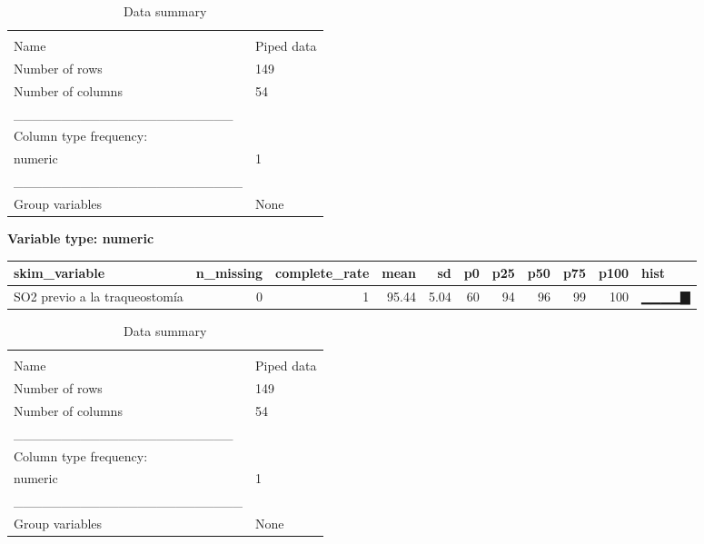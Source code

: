 \documentclass[
]{article}
\newenvironment{Shaded}{\begin{snugshade}}{\end{snugshade}}
\newcommand{\AttributeTok}[1]{\textcolor[rgb]{0.77,0.63,0.00}{#1}}
\newcommand{\DocumentationTok}[1]{\textcolor[rgb]{0.56,0.35,0.01}{\textbf{\textit{#1}}}}
\newcommand{\FunctionTok}[1]{\textcolor[rgb]{0.00,0.00,0.00}{#1}}
\newcommand{\NormalTok}[1]{#1}
\newcommand{\OtherTok}[1]{\textcolor[rgb]{0.56,0.35,0.01}{#1}}
\newcommand{\SpecialCharTok}[1]{\textcolor[rgb]{0.00,0.00,0.00}{#1}}
\newcommand{\StringTok}[1]{\textcolor[rgb]{0.31,0.60,0.02}{#1}}
\begin{document}
\begin{longtable}[]{@{}ll@{}}
\caption{Data summary}\tabularnewline
\toprule
& \\
\midrule
\endfirsthead
\toprule
& \\
\midrule
\endhead
Name & Piped data \\
Number of rows & 149 \\
Number of columns & 54 \\
\_\_\_\_\_\_\_\_\_\_\_\_\_\_\_\_\_\_\_\_\_\_\_ & \\
Column type frequency: & \\
numeric & 1 \\
\_\_\_\_\_\_\_\_\_\_\_\_\_\_\_\_\_\_\_\_\_\_\_\_ & \\
Group variables & None \\
\bottomrule
\end{longtable}

\textbf{Variable type: numeric}

\begin{longtable}[]{@{}lrrrrrrrrrl@{}}
\toprule
skim\_variable & n\_missing & complete\_rate & mean & sd & p0 & p25 &
p50 & p75 & p100 & hist \\
\midrule
\endhead
SO2 previo a la traqueostomía & 0 & 1 & 95.44 & 5.04 & 60 & 94 & 96 & 99
& 100 & ▁▁▁▁▇ \\
\bottomrule
\end{longtable}

\begin{Shaded}
\end{Shaded}

\begin{longtable}[]{@{}ll@{}}
\caption{Data summary}\tabularnewline
\toprule
& \\
\midrule
\endfirsthead
\toprule
& \\
\midrule
\endhead
Name & Piped data \\
Number of rows & 149 \\
Number of columns & 54 \\
\_\_\_\_\_\_\_\_\_\_\_\_\_\_\_\_\_\_\_\_\_\_\_ & \\
Column type frequency: & \\
numeric & 1 \\
\_\_\_\_\_\_\_\_\_\_\_\_\_\_\_\_\_\_\_\_\_\_\_\_ & \\
Group variables & None \\
\bottomrule
\end{longtable}
\end{document}

